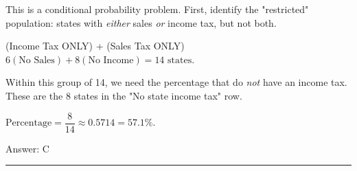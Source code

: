 \documentclass[11pt,paper=a4,answers]{exam}
\begin{document}
\begin{questions}
\begin{solution}
This is a conditional probability problem. First, identify the "restricted" population: states with \textit{either} sales \textit{or} income tax, but not both.
\vspace{5pt}
\begin{center}
(Income Tax ONLY) + (Sales Tax ONLY) \\
$6 (\text{No Sales}) + 8 (\text{No Income}) = 14 \text{ states}$.
\end{center}
\vspace{5pt}
Within this group of 14, we need the percentage that do \textit{not} have an income tax. These are the 8 states in the "No state income tax" row.
\vspace{5pt}
\begin{center}
$\text{Percentage} = \dfrac{8}{14} \approx 0.5714 = 57.1\%$.
\end{center}
\vspace{5pt}
Answer: \colorbox{yellow!100}{C}
\end{solution}


\end{questions}
\begin{center}
\rule{.5\textwidth}{1pt}
\end{center}
\end{document}
